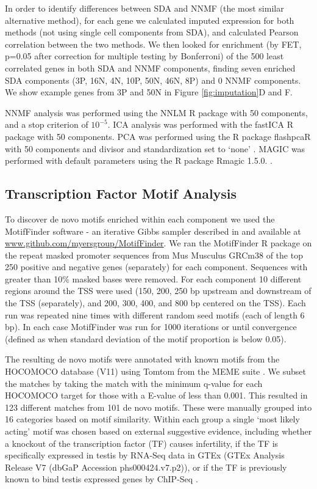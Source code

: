 In order to identify differences between SDA and NNMF (the most similar alternative method), for each gene we calculated imputed expression for both methods (not using single cell components from SDA), and calculated Pearson correlation between the two methods. We then looked for enrichment (by FET, p=0.05 after correction for multiple testing by Bonferroni) of the 500 least correlated genes in both SDA and NNMF components, finding seven enriched SDA components (3P, 16N, 4N, 10P, 50N, 46N, 8P) and 0 NNMF components. We show example genes from 3P and 50N in Figure \ref{fig:imputation}D and F.

NNMF analysis was performed using the NNLM R package \parencite{Lin2019NNLM} with 50 components, and a stop criterion of $10^{-5}$. ICA analysis was performed with the fastICA R package \parencite{Marchini2017fastICA} with 50 components. PCA was performed using the R package flashpcaR with 50 components and divisor and standardization set to ‘none’ \parencite{Abraham2014Fast}. MAGIC was performed with default parameters using the R package Rmagic 1.5.0. \parencite{vanDijk2018Recovering}.


\subsection{Transcription Factor Motif Analysis}

To discover de novo motifs enriched within each component we used the MotifFinder software - an iterative Gibbs sampler described in \cite{Altemose2017map, Davies2016Reengineering} and available at \url{www.github.com/myersgroup/MotifFinder}. We ran the MotifFinder R package on the repeat masked promoter sequences from Mus Musculus GRCm38 of the top 250 positive and negative genes (separately) for each component. Sequences with greater than 10\% masked bases were removed. For each component 10 different regions around the TSS were used (150, 200, 250 bp upstream and downstream of the TSS (separately), and 200, 300, 400, and 800 bp centered on the TSS). Each run was repeated nine times with different random seed motifs (each of length 6 bp). In each case MotifFinder was run for 1000 iterations or until convergence (defined as when standard deviation of the motif proportion is below 0.05).

The resulting de novo motifs were annotated with known motifs from the HOCOMOCO database (V11) using Tomtom from the MEME suite \parencite{Bailey2015MEME, Gupta2007Quantifying, Kulakovskiy2018HOCOMOCO}. We subset the matches by taking the match with the minimum q-value for each HOCOMOCO target for those with a E-value of less than 0.001. This resulted in 123 different matches from 101 de novo motifs. These were manually grouped into 16 categories based on motif similarity. Within each group a single ‘most likely acting’ motif was chosen based on external suggestive evidence, including whether a knockout of the transcription factor (TF) causes infertility, if the TF is specifically expressed in testis by RNA-Seq data in GTEx (GTEx Analysis Release V7 (dbGaP Accession phs000424.v7.p2)), or if the TF is previously known to bind testis expressed genes by ChIP-Seq \parencite{GTExConsortium2013GenotypeTissue}.

